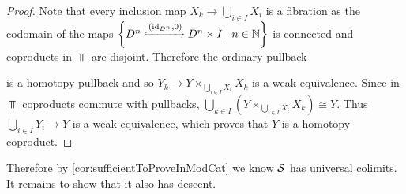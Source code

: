 \begin{lemma}
\begin{proof}
            Note that every inclusion map $X_k\to\bigcup\limits_{i\in I} X_i$ is a fibration as the codomain of the maps $\left\lbrace D^n\xhookrightarrow{\left(\text{id}_{D^n},0\right)}D^n\times I\mid n\in\mathbb{N}\right\rbrace$ is connected and coproducts in $\Top$ are disjoint.
            Therefore the ordinary pullback
            \begin{center}
            \end{center}
            is a homotopy pullback and so $Y_k\to Y\times_{\bigcup\limits_{i\in I} X_i}X_k$ is a weak equivalence.
            Since in $\Top$ coproducts commute with pullbacks, $\bigcup\limits_{k\in I}\left(Y\times_{\bigcup\limits_{i\in I} X_i}X_k\right)\cong Y$.
            Thus $\bigcup\limits_{i\in I}Y_i\to Y$ is a weak equivalence, which proves that $Y$ is a homotopy coproduct.
    \end{proof}
\end{lemma}
Therefore by \cref{cor:sufficientToProveInModCat} we know $\mathcal{S}$ has universal colimits.
It remains to show that it also has descent.

